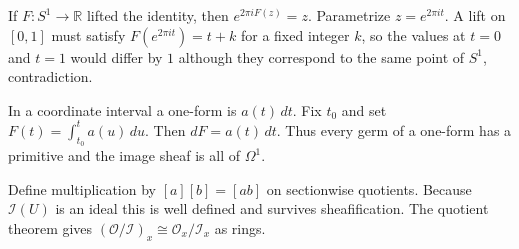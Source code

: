 \begin{solution}[Exercise 24]
If $F:S^1\to\mathbb R$ lifted the identity, then $e^{2\pi iF(z)}=z$. Parametrize $z=e^{2\pi it}$. A lift on $[0,1]$ must satisfy $F(e^{2\pi it})=t+k$ for a fixed integer $k$, so the values at $t=0$ and $t=1$ would differ by $1$ although they correspond to the same point of $S^1$, contradiction.
\end{solution}

\begin{solution}[Exercise 25]
In a coordinate interval a one-form is $a(t)\,dt$. Fix $t_0$ and set $F(t)=\int_{t_0}^t a(u)\,du$. Then $dF=a(t)\,dt$. Thus every germ of a one-form has a primitive and the image sheaf is all of $\Omega^1$.
\end{solution}

\begin{solution}[Exercise 26]
Define multiplication by $[a][b]=[ab]$ on sectionwise quotients. Because $\mathcal I(U)$ is an ideal this is well defined and survives sheafification. The quotient theorem gives $(\mathcal O/\mathcal I)_x\cong\mathcal O_x/\mathcal I_x$ as rings.
\end{solution}

